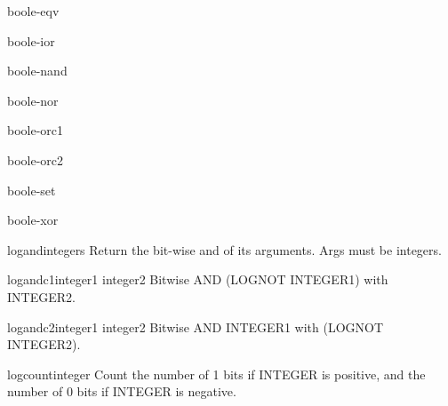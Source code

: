 \begin{constant}{boole-eqv}{}{}{}
  
\end{constant}

\begin{constant}{boole-ior}{}{}{}
  
\end{constant}

\begin{constant}{boole-nand}{}{}{}
  
\end{constant}

\begin{constant}{boole-nor}{}{}{}
  
\end{constant}

\begin{constant}{boole-orc1}{}{}{}
  
\end{constant}

\begin{constant}{boole-orc2}{}{}{}
  
\end{constant}

\begin{constant}{boole-set}{}{}{}
  
\end{constant}

\begin{constant}{boole-xor}{}{}{}
  
\end{constant}

\begin{function}{logand}{\rest integers}{}{}
  Return the bit-wise and of its arguments. Args must be integers.
\end{function}

\begin{function}{logandc1}{integer1 integer2}{}{}
  Bitwise AND (LOGNOT INTEGER1) with INTEGER2.
\end{function}

\begin{function}{logandc2}{integer1 integer2}{}{}
  Bitwise AND INTEGER1 with (LOGNOT INTEGER2).
\end{function}

\begin{function}{logcount}{integer}{}{}
  Count the number of 1 bits if INTEGER is positive, and the number of 0 bits
  if INTEGER is negative.
\end{function}

